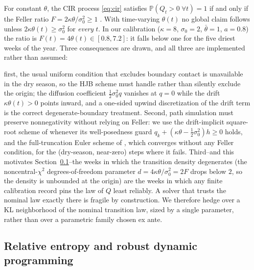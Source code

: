 \documentclass[pdflatex,sn-mathphys-num]{sn-jnl}
\theoremstyle{thmstyleone}
\theoremstyle{thmstyletwo}
\theoremstyle{thmstylethree}
\newcommand{\Prob}{\mathbb{P}}
\begin{document}
For constant $\theta$, the CIR process \eqref{eq:cir} satisfies
$\Prob(Q_t>0 \;\forall t)=1$ if and only if the Feller ratio
$F = 2\kappa\theta/\sigma_0^2 \ge 1$ \citep{feller1951,cir1985}. With
time-varying $\theta(t)$ no global claim follows unless
$2\kappa\theta(t)\ge\sigma_0^2$ for \emph{every} $t$. In our calibration
($\kappa=8$, $\sigma_0=2$, $\bar\theta=1$, $a=0.8$) the ratio is
$F(t)=4\theta(t)\in[0.8,7.2]$: it falls below one for the five driest
weeks of the year. Three consequences are drawn, and all three are
implemented rather than assumed:

first, the usual uniform condition that excludes boundary contact is
unavailable in the dry season, so the HJB scheme must handle rather than
silently exclude the origin;
the diffusion coefficient $\tfrac12\sigma_0^2 q$ vanishes at $q=0$ while
the drift $\kappa\theta(t)>0$ points inward, and a one-sided upwind
discretization of the drift term is the correct degenerate-boundary
treatment. Second, path simulation must preserve nonnegativity without
relying on Feller: we use the drift-implicit square-root scheme of
\citet{alfonsi2005} whenever its well-posedness guard
$q_k + (\kappa\theta - \tfrac12\sigma_0^2)h \ge 0$ holds, and the
full-truncation Euler scheme of \citet{lord2010}, which converges without
any Feller condition, for the (dry-season, near-zero) steps where it
fails. Third--and this motivates Section~\ref{sec:entropy}--the weeks
in which the transition density degenerates (the noncentral-$\chi^2$
degrees-of-freedom parameter $d = 4\kappa\theta/\sigma_0^2 = 2F$ drops
below $2$, so the density is unbounded at the origin) are the weeks in
which any finite calibration record pins the law of $Q$ least reliably.
A solver that trusts the nominal law exactly there is fragile by
construction. We therefore hedge over a KL neighborhood of the nominal
transition law, sized by a single parameter, rather than over a
parametric family chosen ex ante.

\subsection{Relative entropy and robust dynamic programming}
\label{sec:entropy}
\end{document}
